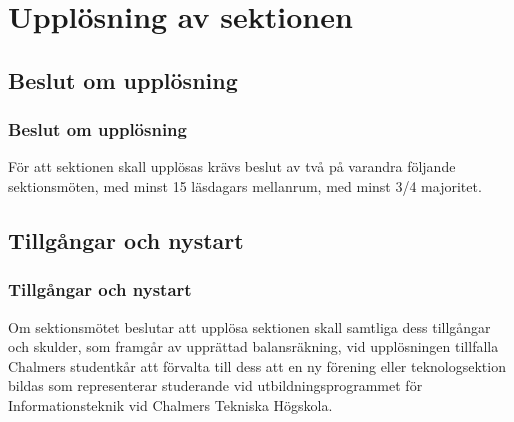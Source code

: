 \section{Upplösning av sektionen}

\subsection{Beslut om upplösning}

\subsubsection{Beslut om upplösning}
För att sektionen skall upplösas krävs beslut av två på varandra följande sektionsmöten, med minst 15 läsdagars mellanrum, med minst 3/4 majoritet.


\subsection{Tillgångar och nystart}

\subsubsection{Tillgångar och nystart}
Om sektionsmötet beslutar att upplösa sektionen skall samtliga dess tillgångar och skulder, som framgår av upprättad balansräkning, vid upplösningen tillfalla Chalmers studentkår att förvalta till dess att en ny förening eller teknologsektion bildas som representerar studerande vid utbildningsprogrammet för Informationsteknik vid Chalmers Tekniska Högskola.